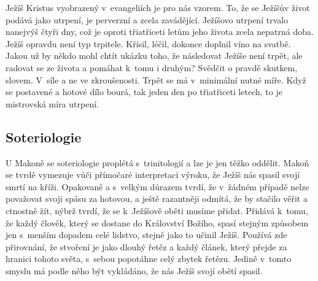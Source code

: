 Ježíš Kristus vyobrazený v~evangeliích je pro nás vzorem. To, že se Ježíšův
život podává jako utrpení, je perverzní a zcela zavádějící. Ježíšovo utrpení
trvalo nanejvýš čtyři dny, což je oproti třiatřiceti letům jeho života zcela
nepatrná doba. Ježíš opravdu není typ trpitele. Křísil, léčil, dokonce doplnil
víno na svatbě. Jakou už by někdo mohl chtít ukázku toho, že následovat Ježíše
není trpět, ale radovat se ze života a pomáhat k~tomu i druhým? Svědčit o pravdě
skutkem, slovem. V~síle a ne ve zkroušenosti. Trpět se má v~minimální nutné
míře. Když se postavené a hotové dílo bourá, tak jeden den po třiatřiceti
letech, to je mistrovská míra utrpení.



\subsection{Soteriologie}

U Makoně se soteriologie proplétá s~trinitologií a lze je jen těžko oddělit.
Makoň se tvrdě vymezuje vůči přímočaré interpretaci výroku, že Ježíš nás spasil
svojí smrtí na kříži. Opakovaně a s~velkým důrazem tvrdí, že v~žádném případě
nelze považovat svoji spásu za hotovou, a ještě razantněji odmítá, že by stačilo
věřit a ctnostně žít, nýbrž tvrdí, že se k~Ježíšově oběti musíme
přidat. Přidává k~tomu, že každý člověk, který se dostane do Království Božího,
spasí stejným způsobem jen s~menším dopadem celé lidstvo, stejně jako to učinil
Ježíš. Používá zde přirovnání, že stvoření je jako dlouhý řetěz a každý článek,
který přejde za hranici tohoto světa, s~sebou popotáhne celý zbytek řetězu.
Jedině v~tomto smyslu má podle něho být vykládáno, že nás Ježíš svojí obětí
spasil.

